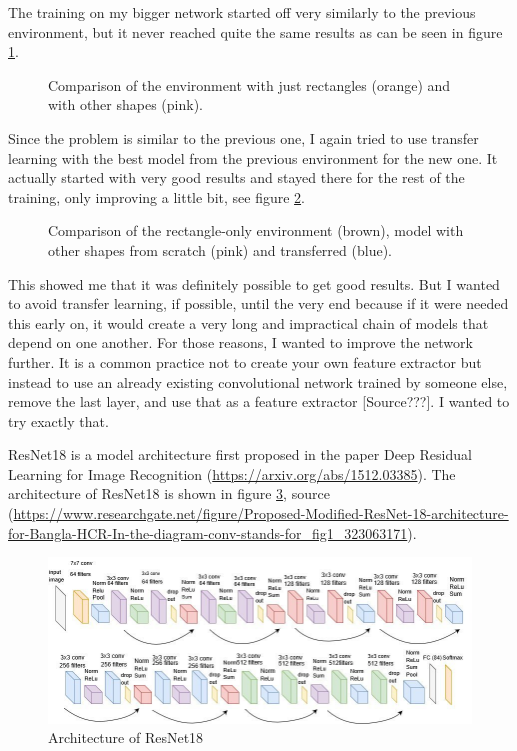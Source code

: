 \documentclass[
  digital,     %
  oneside,     %
  nosansbold,  %
  nocolorbold, %
  lof,         %
  lot,         %
]{fithesis4}
\begin{document}
The training on my bigger network started off very similarly to the previous environment, but it never reached quite the same results as can be seen in figure \ref{fig:v4_bigger_net}.

\begin{figure}
    \centering
    \makebox[\textwidth][c]{}
    \caption{Comparison of the environment with just rectangles (orange) and with other shapes (pink).}
    \label{fig:v4_bigger_net}
\end{figure}

Since the problem is similar to the previous one, I again tried to use transfer learning with the best model from the previous environment for the new one. It actually started with very good results and stayed there for the rest of the training, only improving a little bit, see figure \ref{fig:v4_transfer}.

\begin{figure}
    \centering
    \makebox[\textwidth][c]{}
    \caption{Comparison of the rectangle-only environment (brown), model with other shapes from scratch (pink) and transferred (blue).}
    \label{fig:v4_transfer}
\end{figure}

This showed me that it was definitely possible to get good results. But I wanted to avoid transfer learning, if possible, until the very end because if it were needed this early on, it would create a very long and impractical chain of models that depend on one another. For those reasons, I wanted to improve the network further. It is a common practice not to create your own feature extractor but instead to use an already existing convolutional network trained by someone else, remove the last layer, and use that as a feature extractor [Source???]. I wanted to try exactly that.

ResNet18 is a model architecture first proposed in the paper Deep Residual Learning for Image Recognition (\url{https://arxiv.org/abs/1512.03385}). The architecture of ResNet18 is shown in figure \ref{fig:resnet}, source (\url{https://www.researchgate.net/figure/Proposed-Modified-ResNet-18-architecture-for-Bangla-HCR-In-the-diagram-conv-stands-for_fig1_323063171}).

\begin{figure}
    \centering
    \includegraphics[width=1\linewidth]{diagrams/resnet.png}
    \caption{Architecture of ResNet18}
    \label{fig:resnet}
\end{figure}
\end{document}
